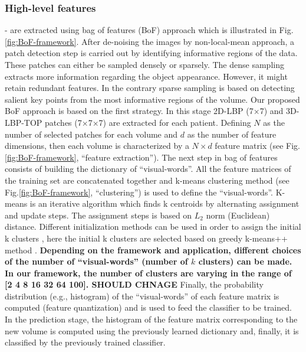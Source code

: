 \subsubsection{High-level features} - are extracted using bag of features (BoF) approach which is illustrated in Fig. \ref{fig:BoF-framework}. After de-noising the images by non-local-mean approach, a patch detection step is carried out by identifying informative regions of the data. These patches can either be sampled densely or sparsely. The dense sampling extracts more information regarding the object appearance. However, it might retain redundant features. In the contrary sparse sampling is based on detecting salient key points from the most informative regions of the volume. Our proposed BoF approach is based on the first strategy. In this stage 2D-LBP (7$\times$7) and 3D-LBP-TOP patches (7$\times$7$\times$7) are extracted for each patient. Defining $N$ as the number of selected patches for each volume and $d$ as the number of feature dimensions, then each volume is characterized by a $N \times d$ feature matrix (see Fig. \ref{fig:BoF-framework}, ``feature extraction''). The next step in bag of features consists of building the dictionary of ``visual-words''. All the feature matrices of the training set are concatenated together and k-means clustering method (see Fig.\ref{fig:BoF-framework}, ``clustering'') is used to define the ``visual-words''. K-means is an iterative algorithm which finds k centroids by alternating assignment and update steps. The assignment steps is based on $L_{2}$ norm (Euclidean) distance. Different initialization methods can be used in order to assign the initial k clusters \cite {celebi2013comparative}, here the initial k clusters are selected based on greedy k-means++ method \cite{arthur2007k}. \textbf{Depending on the framework and application, different choices of the number of ``visual-words'' (number of $k$ clusters) can be made. In our framework, the number of clusters are varying in the range of [2 4 8 16 32 64 100]. SHOULD CHNAGE} Finally, the probability distribution (e.g., histogram) of the ``visual-words'' of each feature matrix is computed (feature quantization) and is used to feed the classifier to be trained. In the prediction stage, the histogram of the feature matrix corresponding to the new volume is computed using the previously learned dictionary and, finally, it is classified by the previously trained classifier.\\

%

